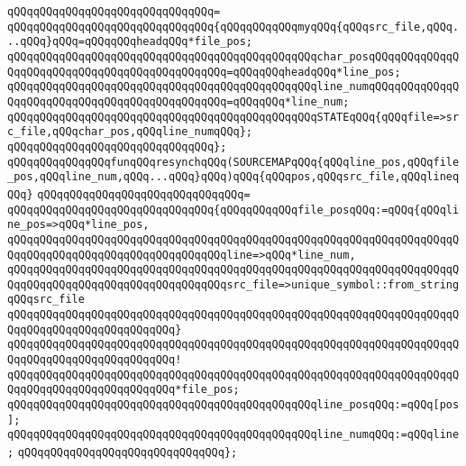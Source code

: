 \verb|qQQqqQQqqQQqqQQqqQQqqQQqqQQqqQQq=|\newline
\verb|qQQqqQQqqQQqqQQqqQQqqQQqqQQqqQQq{qQQqqQQqqQQqmyqQQq{qQQqsrc_file,qQQq...qQQq}qQQq=qQQqqQQqheadqQQq*file_pos;|\newline
\verb|qQQqqQQqqQQqqQQqqQQqqQQqqQQqqQQqqQQqqQQqqQQqqQQqchar_posqQQqqQQqqQQqqQQqqQQqqQQqqQQqqQQqqQQqqQQqqQQqqQQq=qQQqqQQqheadqQQq*line_pos;|\newline
\verb|qQQqqQQqqQQqqQQqqQQqqQQqqQQqqQQqqQQqqQQqqQQqqQQqline_numqQQqqQQqqQQqqQQqqQQqqQQqqQQqqQQqqQQqqQQqqQQqqQQq=qQQqqQQq*line_num;|\newline
\newline
\verb|qQQqqQQqqQQqqQQqqQQqqQQqqQQqqQQqqQQqqQQqqQQqqQQqSTATEqQQq{qQQqfile=>src_file,qQQqchar_pos,qQQqline_numqQQq};|\newline
\verb|qQQqqQQqqQQqqQQqqQQqqQQqqQQqqQQq};|\newline
\newline
\verb|qQQqqQQqqQQqqQQqfunqQQqresynchqQQq(SOURCEMAPqQQq{qQQqline_pos,qQQqfile_pos,qQQqline_num,qQQq...qQQq}qQQq)qQQq{qQQqpos,qQQqsrc_file,qQQqlineqQQq}|\newline
\verb|qQQqqQQqqQQqqQQqqQQqqQQqqQQqqQQq=|\newline
\verb|qQQqqQQqqQQqqQQqqQQqqQQqqQQqqQQq{qQQqqQQqqQQqfile_posqQQq:=qQQq{qQQqline_pos=>qQQq*line_pos,|\newline
\verb|qQQqqQQqqQQqqQQqqQQqqQQqqQQqqQQqqQQqqQQqqQQqqQQqqQQqqQQqqQQqqQQqqQQqqQQqqQQqqQQqqQQqqQQqqQQqqQQqqQQqqQQqline=>qQQq*line_num,|\newline
\verb|qQQqqQQqqQQqqQQqqQQqqQQqqQQqqQQqqQQqqQQqqQQqqQQqqQQqqQQqqQQqqQQqqQQqqQQqqQQqqQQqqQQqqQQqqQQqqQQqqQQqqQQqsrc_file=>unique_symbol::from_stringqQQqsrc_file|\newline
\verb|qQQqqQQqqQQqqQQqqQQqqQQqqQQqqQQqqQQqqQQqqQQqqQQqqQQqqQQqqQQqqQQqqQQqqQQqqQQqqQQqqQQqqQQqqQQqqQQq}|\newline
\verb|qQQqqQQqqQQqqQQqqQQqqQQqqQQqqQQqqQQqqQQqqQQqqQQqqQQqqQQqqQQqqQQqqQQqqQQqqQQqqQQqqQQqqQQqqQQqqQQq!|\newline
\verb|qQQqqQQqqQQqqQQqqQQqqQQqqQQqqQQqqQQqqQQqqQQqqQQqqQQqqQQqqQQqqQQqqQQqqQQqqQQqqQQqqQQqqQQqqQQqqQQq*file_pos;|\newline
\newline
\verb|qQQqqQQqqQQqqQQqqQQqqQQqqQQqqQQqqQQqqQQqqQQqqQQqline_posqQQq:=qQQq[pos];|\newline
\verb|qQQqqQQqqQQqqQQqqQQqqQQqqQQqqQQqqQQqqQQqqQQqqQQqline_numqQQq:=qQQqline;|\newline
\verb|qQQqqQQqqQQqqQQqqQQqqQQqqQQqqQQq};|\newline
